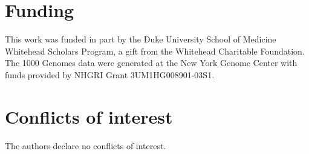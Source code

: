 \documentclass[9pt,twocolumn,twoside]{gsajnl}
\begin{document}

\section{Funding}
This work was funded in part by the Duke University School of Medicine Whitehead Scholars Program, a gift from the Whitehead Charitable Foundation.
The 1000 Genomes data were generated at the New York Genome Center with funds provided by NHGRI Grant 3UM1HG008901-03S1.

\section{Conflicts of interest}
The authors declare no conflicts of interest.


\end{document}
